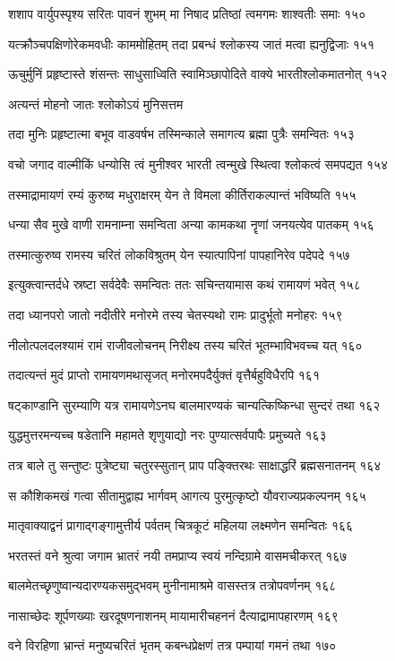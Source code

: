 शशाप वार्युपस्पृश्य सरितः पावनं शुभम्
मा निषाद प्रतिष्ठां त्वमगमः शाश्वतीः समाः १५०

यत्क्रौञ्चपक्षिणोरेकमवधीः काममोहितम्
तदा प्रबन्धं श्लोकस्य जातं मत्वा ह्यनुद्विजाः १५१

ऊचुर्मुनिं प्रहृष्टास्ते शंसन्तः साधुसाध्विति
स्वामिञ्छापोदिते वाक्ये भारतीश्लोकमातनोत् १५२

अत्यन्तं मोहनो जातः श्लोकोऽयं मुनिसत्तम

तदा मुनिः प्रहृष्टात्मा बभूव वाडवर्षभ
तस्मिन्काले समागत्य ब्रह्मा पुत्रैः समन्वितः १५३

वचो जगाद वाल्मीकिं धन्योसि त्वं मुनीश्वर
भारती त्वन्मुखे स्थित्वा श्लोकत्वं समपद्यत १५४

तस्माद्रामायणं रम्यं कुरुष्व मधुराक्षरम्
येन ते विमला कीर्तिराकल्पान्तं भविष्यति १५५

धन्या सैव मुखे वाणी रामनाम्ना समन्विता
अन्या कामकथा नॄणां जनयत्येव पातकम् १५६

तस्मात्कुरुष्व रामस्य चरितं लोकविश्रुतम्
येन स्यात्पापिनां पापहानिरेव पदेपदे १५७

इत्युक्त्वान्तर्दधे स्रष्टा सर्वदेवैः समन्वितः
ततः सचिन्तयामास कथं रामायणं भवेत् १५८

तदा ध्यानपरो जातो नदीतीरे मनोरमे
तस्य चेतस्यथो रामः प्रादुर्भूतो मनोहरः १५९

नीलोत्पलदलश्यामं रामं राजीवलोचनम्
निरीक्ष्य तस्य चरितं भूतम्भाविभवच्च यत् १६०

तदात्यन्तं मुदं प्राप्तो रामायणमथासृजत्
मनोरमपदैर्युक्तं वृत्तैर्बहुविधैरपि १६१

षट्काण्डानि सुरम्याणि यत्र रामायणेऽनघ
बालमारण्यकं चान्यत्किष्किन्धा सुन्दरं तथा १६२

युद्धमुत्तरमन्यच्च षडेतानि महामते
शृणुयाद्यो नरः पुण्यात्सर्वपापैः प्रमुच्यते १६३

तत्र बाले तु सन्तुष्टः पुत्रेष्ट्या चतुरस्सुतान्
प्राप पङ्क्तिरथः साक्षाद्धरिं ब्रह्मसनातनम् १६४

स कौशिकमखं गत्वा सीतामुद्वाह्य भार्गवम्
आगत्य पुरमुत्कृष्टो यौवराज्यप्रकल्पनम् १६५

मातृवाक्याद्वनं प्रागाद्गङ्गामुत्तीर्य पर्वतम्
चित्रकूटं महिलया लक्ष्मणेन समन्वितः १६६

भरतस्तं वने श्रुत्वा जगाम भ्रातरं नयी
तमप्राप्य स्वयं नन्दिग्रामे वासमचीकरत् १६७

बालमेतच्छृणुष्वान्यदारण्यकसमुद्भवम्
मुनीनामाश्रमे वासस्तत्र तत्रोपवर्णनम् १६८

नासाच्छेदः शूर्पणख्याः खरदूषणनाशनम्
मायामारीचहननं दैत्याद्रामापहारणम् १६९

वने विरहिणा भ्रान्तं मनुष्यचरितं भृतम्
कबन्धप्रेक्षणं तत्र पम्पायां गमनं तथा १७०

